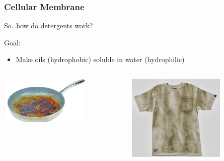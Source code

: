 \documentclass[10pt]{beamer}
\begin{document}
\begin{frame}[t]
\frametitle{Cellular Membrane}
\vspace{0.5cm}

	So\ldots how do detergents work?
	
	\vspace{0.25cm}
	
	Goal:
		\begin{itemize}
			\item Make oils (hydrophobic) soluble in water (hydrophilic)
		\end{itemize}
	
	\vspace{0.5cm}
	
	\begin{columns}
		\begin{column}{0.5\textwidth}
			\centerline{\includegraphics[width=0.7\textwidth]{figures/pan.jpg}}
		\end{column}
		
		\begin{column}{0.5\textwidth}
			\centerline{\includegraphics[width=0.7\textwidth]{figures/shirt.jpg}}
		\end{column}
	\end{columns}	
\end{frame}
\end{document}
